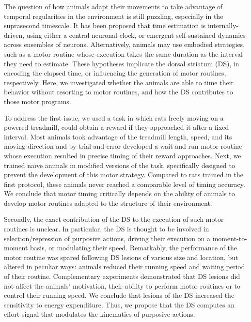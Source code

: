 The question of how animals adapt their movements to take advantage of temporal regularities in the environment is still puzzling, especially in the suprasecond timescale.
It has been proposed that time estimation is internally-driven, using either a central neuronal clock, or emergent self-sustained dynamics across ensembles of neurons.
Alternatively, animals may use embodied strategies, such as a motor routine whose execution takes the same duration as the interval they need to estimate.
These hypotheses implicate the dorsal striatum (DS), in encoding the elapsed time, or influencing the generation of motor routines, respectively.
Here, we investigated whether the animals are able to time their behavior without resorting to motor routines, and how the DS contributes to those motor programs.

\par

To address the first issue, we used a task in which rats freely moving on a powered treadmill, could obtain a reward if they approached it after a fixed interval.
Most animals took advantage of the treadmill length, speed, and its moving direction and by trial-and-error developed a wait-and-run motor routine whose execution resulted in precise timing of their reward approaches.
Next, we trained na\"ive animals in modified versions of the task, specifically designed to prevent the development of this motor strategy.
Compared to rats trained in the first protocol, these animals never reached a comparable level of timing accuracy.
We conclude that motor timing critically depends on the ability of animals to develop motor routines adapted to the structure of their environment.

\par

Secondly, the exact contribution of the DS to the execution of such motor routines is unclear.
In particular, the DS is thought to be involved in selection/repression of purposive actions, driving their execution on a moment-to-moment basis, or modulating their speed. 
Remarkably, the performance of the motor routine was spared following DS lesions of various size and location, but altered in peculiar ways:
animals reduced their running speed and waiting period of their routine.
Complementary experiments demonstrated that DS lesions did not affect the animals' motivation, their ability to perform motor routines or to control their running speed.
We conclude that lesions of the DS increased the sensitivity to energy expenditure.
Thus, we propose that the DS computes an effort signal that modulates the kinematics of purposive actions.